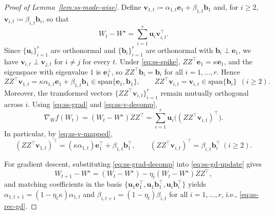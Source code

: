 \documentclass[10pt,a4paper]{amsart}
\begin{document}
\begin{proof}[Proof of Lemma~\ref{lem:ss-mode-wise}]
Define $\boldsymbol{v}_{1,t}\coloneqq \alpha_{1,t}\boldsymbol{e}_1+\beta_{1,t}\boldsymbol{b}_1$ and, for $i\ge 2$, $\boldsymbol{v}_{i,t}\coloneqq \beta_{i,t}\boldsymbol{b}_i$, so that
\begin{equation}
  \label{eq:ss-v-decomp}
  W_t-W^\star=\sum_{i=1}^r \boldsymbol{u}_i\boldsymbol{v}_{i,t}^\top.
\end{equation}
Since $\{\boldsymbol{u}_i\}_{i=1}^r$ are orthonormal and $\{\boldsymbol{b}_i\}_{i=1}^r$ are orthonormal with $\boldsymbol{b}_i\perp \boldsymbol{e}_1$, we have $\boldsymbol{v}_{i,t}\perp \boldsymbol{v}_{j,t}$ for $i\neq j$ for every $t$.
Under \eqref{eq:ss-spike}, $ZZ^\top \boldsymbol{e}_1=\kappa \boldsymbol{e}_1$, and the eigenspace with eigenvalue $1$ is $\boldsymbol{e}_1^\perp$, so $ZZ^\top \boldsymbol{b}_i=\boldsymbol{b}_i$ for all $i=1,\dots,r$. Hence
\begin{equation}
  \label{eq:ss-v-mapped}
  ZZ^\top \boldsymbol{v}_{1,t}=\kappa\alpha_{1,t}\boldsymbol{e}_1+\beta_{1,t}\boldsymbol{b}_1 \in \mathrm{span}\{\boldsymbol{e}_1,\boldsymbol{b}_1\},
  \qquad
  ZZ^\top \boldsymbol{v}_{i,t}=\boldsymbol{v}_{i,t}\in \mathrm{span}\{\boldsymbol{b}_i\}\ \ (i\ge 2).
\end{equation}
Moreover, the transformed vectors $\{ZZ^\top\boldsymbol{v}_{i,t}\}_{i=1}^r$ remain mutually orthogonal across $i$. Using \eqref{eq:ss-grad} and \eqref{eq:ss-v-decomp},
\begin{equation}
  \label{eq:ss-grad-decomp}
  \nabla_W f(W_t)=(W_t-W^\star)ZZ^\top
  =
  \sum_{i=1}^r \boldsymbol{u}_i\big((ZZ^\top\boldsymbol{v}_{i,t})^\top\big).
\end{equation}
In particular, by \eqref{eq:ss-v-mapped},
\[
(ZZ^\top\boldsymbol{v}_{1,t})^\top=(\kappa\alpha_{1,t})\boldsymbol{e}_1^\top+\beta_{1,t}\boldsymbol{b}_1^\top,
\qquad
(ZZ^\top\boldsymbol{v}_{i,t})^\top=\beta_{i,t}\boldsymbol{b}_i^\top \ (i\ge 2).
\]

For gradient descent, substituting \eqref{eq:ss-grad-decomp} into \eqref{eq:ss-gd-update} gives
\[
W_{t+1}-W^\star
=
(W_t-W^\star)-\eta_t(W_t-W^\star)ZZ^\top,
\]
and matching coefficients in the basis $\{\boldsymbol{u}_1\boldsymbol{e}_1^\top,\boldsymbol{u}_1\boldsymbol{b}_1^\top,\boldsymbol{u}_i\boldsymbol{b}_i^\top\}$ yields $\alpha_{1,t+1}=(1-\eta_t\kappa)\alpha_{1,t}$ and $\beta_{i,t+1}=(1-\eta_t)\beta_{i,t}$ for all $i=1,\dots,r$, i.e., \eqref{eq:ss-rec-gd}.


\end{proof}
\end{document}
